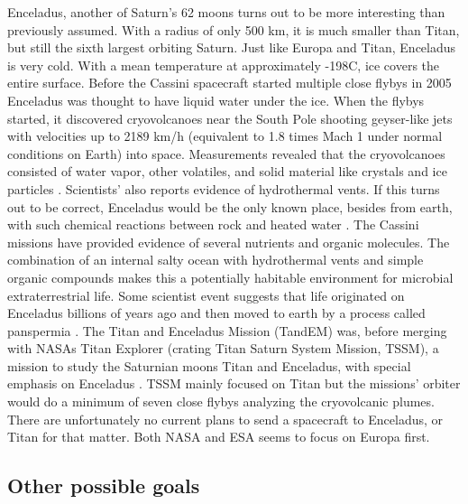 Enceladus, another of Saturn’s 62 moons turns out to be more interesting than previously assumed.
With a radius of only 500 km, it is much smaller than Titan, but still the sixth largest orbiting Saturn.
Just like Europa and Titan, Enceladus is very cold.
With a mean temperature at approximately -198\degree C, ice covers the entire surface.
Before the Cassini spacecraft started multiple close flybys in 2005 Enceladus was thought to have liquid water under the ice.
When the flybys started, it discovered cryovolcanoes near the South Pole shooting geyser-like jets with velocities up to 2189 km/h (equivalent to 1.8 times Mach 1 under normal conditions on Earth) into space.
Measurements revealed that the cryovolcanoes consisted of water vapor, other volatiles, and solid material like crystals and ice particles \cite{FPlan08}.
Scientists’ also reports evidence of hydrothermal vents.
If this turns out to be correct, Enceladus would be the only known place, besides from earth, with such chemical reactions between rock and heated water \cite{FPlan09}.
The Cassini missions have provided evidence of several nutrients and organic molecules.
The combination of an internal salty ocean with hydrothermal vents and simple organic compounds makes this a potentially habitable environment for microbial extraterrestrial life.
Some scientist event suggests that life originated on Enceladus billions of years ago and then moved to earth by a process called panspermia \cite{FPlan08}.
The Titan and Enceladus Mission (TandEM) was, before merging with NASAs Titan Explorer (crating Titan Saturn System Mission, TSSM), a mission to study the Saturnian moons Titan and Enceladus, with special emphasis on Enceladus \cite{FPlan11}.
TSSM mainly focused on Titan but the missions’ orbiter would do a minimum of seven close flybys analyzing the cryovolcanic plumes.
There are unfortunately no current plans to send a spacecraft to Enceladus, or Titan for that matter.
Both NASA and ESA seems to focus on Europa first.

\subsection*{Other possible goals}

